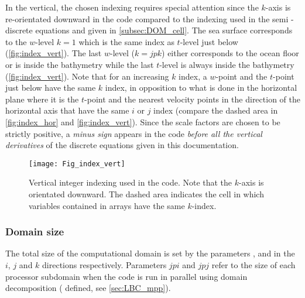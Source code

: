 \documentclass[../main/NEMO_manual]{subfiles}
\begin{document}
In the vertical, the chosen indexing requires special attention since the $k$-axis is re-orientated downward in
the \fortran code compared to the indexing used in the semi -discrete equations and
given in \autoref{subsec:DOM_cell}.
The sea surface corresponds to the $w$-level $k = 1$ which is the same index as $t$-level just below
(\autoref{fig:index_vert}).
The last $w$-level ($k = jpk$) either corresponds to the ocean floor or is inside the bathymetry while
the last $t$-level is always inside the bathymetry (\autoref{fig:index_vert}).
Note that for an increasing $k$ index, a $w$-point and the $t$-point just below have the same $k$ index,
in opposition to what is done in the horizontal plane where
it is the $t$-point and the nearest velocity points in the direction of the horizontal axis that
have the same $i$ or $j$ index
(compare the dashed area in \autoref{fig:index_hor} and \autoref{fig:index_vert}).
Since the scale factors are chosen to be strictly positive,
a \textit{minus sign} appears in the \fortran code \textit{before all the vertical derivatives} of
the discrete equations given in this documentation.

\begin{figure}[!pt]
  \begin{center}
    \texttt{[image: Fig\_index\_vert]}
    \caption{
      \protect\label{fig:index_vert}
      Vertical integer indexing used in the \fortran code.
      Note that the $k$-axis is orientated downward.
      The dashed area indicates the cell in which variables contained in arrays have the same $k$-index.
    }
  \end{center}
\end{figure}

\subsubsection{Domain size}
\label{subsec:DOM_size}

The total size of the computational domain is set by the parameters ,
 and  in the $i$, $j$ and $k$ directions respectively.
Parameters $jpi$ and $jpj$ refer to the size of each processor subdomain when
the code is run in parallel using domain decomposition ( defined,
see \autoref{sec:LBC_mpp}).

\end{document}
